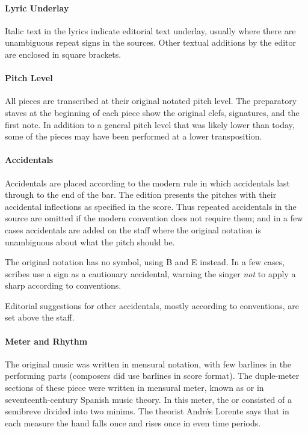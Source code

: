 \paragraph{Lyric Underlay}
Italic text in the lyrics indicate editorial text underlay, usually where there are unambiguous repeat signs in the sources.
Other textual additions by the editor are enclosed in square brackets.

\paragraph{Pitch Level}
All pieces are transcribed at their original notated pitch level.
The preparatory staves at the beginning of each piece show the original clefs, signatures, and the first note.
In addition to a general pitch level that was likely lower than today, some of the pieces may have been performed at a lower transposition.

\paragraph{Accidentals}
Accidentals are placed according to the modern rule in which accidentals last through to the end of the bar.
The edition presents the pitches with their accidental inflections as specified in the score.
Thus repeated accidentals in the source are omitted if the modern convention does not require them; and in a few cases accidentals are added on the staff where the original notation is unambiguous about what the pitch should be.

The original notation has no \na{} symbol, using B\sh{} and E\sh{} instead.
In a few cases, scribes use a \sh{} sign as a cautionary accidental, warning the singer \emph{not} to apply a sharp according to  conventions.%
  \autocites{Harran:Cautionary1}{Harran:Cautionary2}

Editorial suggestions for other accidentals, mostly according to  conventions, are set above the staff.

\paragraph{Meter and Rhythm}
The original music was written in mensural notation, with few barlines in the performing parts (composers did use barlines in score format). 
The duple-meter sections of these piece were written in mensural \meterC{} meter, known as  or  in seventeenth-century Spanish music theory.%
  \autocites[537--538,740]{Cerone:Melopeo}[210]{Lorente:Porque}
  {GonzalezValle:CompasCabezon}{GonzalezValle:MusicaTexto}
In this meter, the  or  consisted of a semibreve divided into two minims.
The theorist Andrés Lorente says that in each measure the hand falls once and rises once in even time periods.

